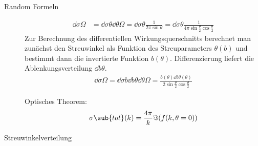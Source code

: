 \documentclass[twocolumn]{summery_4.1}
\begin{document}
\begin{description}
    \item[Random Formeln]
    \begin{align*}
        \dd\sigma\Omega &= \dd\sigma\theta\dd\theta\Omega = \dd\sigma\theta \frac1{2\pi \sin\theta} = \dd \sigma\theta \frac{1}{4\pi \sin\frac\theta2\cos\frac\theta2}
    \end{align*}
    Zur Berechnung des differentiellen Wirkungsquerschnitts berechnet man zunächst den Streuwinkel als Funktion des Streuparameters $\theta(b)$ und bestimmt dann die invertierte Funktion $b(\theta)$. Differenzierung liefert die Ablenkungsverteilung $\dd b\theta$.
    \begin{align*}
        \dd\sigma\Omega = \dd \sigma b \dd b\theta \dd\theta\Omega = \frac{b(\theta) \dd b \theta (\theta)}{2\sin\frac\theta2\cos\frac\theta2}
    \end{align*}
    
    Optisches Theorem:
    \begin{align*}
        \sigma\sub{tot}(k) = \frac{4\pi}k \Im(f(k,\theta = 0))
    \end{align*} 

    \item[Streuwinkelverteilung]\,
    

\end{description}
\end{document}
